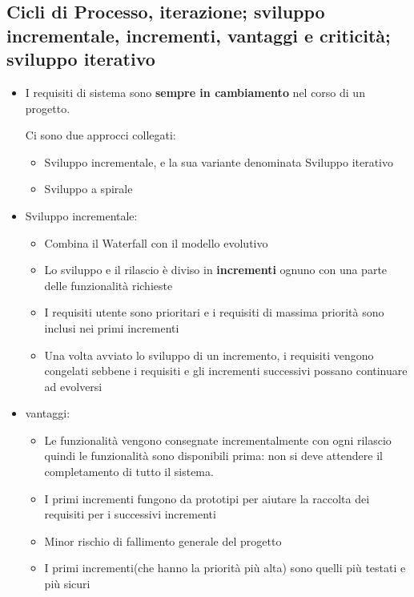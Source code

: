 \subsection{Cicli di Processo, iterazione; sviluppo incrementale, incrementi, vantaggi e criticità; sviluppo iterativo}
\begin{itemize}
    \item I requisiti di sistema sono \textbf{sempre in cambiamento} nel corso di un progetto.

    Ci sono due approcci collegati:
    \begin{itemize}
        \item Sviluppo incrementale, e la sua variante denominata Sviluppo iterativo
        \item Sviluppo a spirale
    \end{itemize}
    
    \item Sviluppo incrementale:
    \begin{itemize}
        \item Combina il Waterfall con il modello evolutivo
        \item Lo sviluppo e il rilascio è diviso in \textbf{incrementi} ognuno con una parte delle funzionalità richieste
        \item I requisiti utente sono prioritari e i requisiti di massima priorità sono inclusi nei primi incrementi
        \item Una volta avviato lo sviluppo di un incremento, i requisiti vengono congelati sebbene i requisiti e gli incrementi successivi possano continuare ad evolversi
    \end{itemize}
    
    \item vantaggi:
    \begin{itemize}
        \item Le funzionalità vengono consegnate incrementalmente con ogni rilascio quindi le funzionalità sono disponibili prima: non si deve attendere il completamento di tutto il sistema.
        \item I primi incrementi fungono da prototipi per aiutare la raccolta dei requisiti per i successivi incrementi
        \item Minor rischio di fallimento generale del progetto
        \item I primi incrementi(che hanno la priorità più alta) sono quelli più testati e più sicuri
    \end{itemize}
    

\end{itemize}
